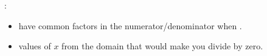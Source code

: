  :
\begin{itemize}[]
    \item have  common factors in the numerator/denominator when .
    \item {} values of $x$ from the domain that would make you divide by zero.
\end{itemize}